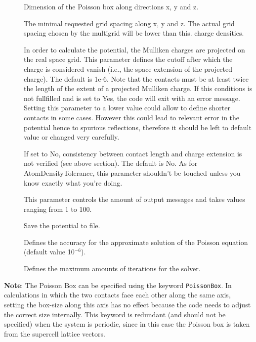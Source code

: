 \begin{description}
\item[] Dimension of the Poisson box
  along directions x, y and z.
\item[] The minimal requested grid
  spacing along x, y and z. The actual grid spacing chosen by the multigrid will
  be lower than this.  charge densities.
  \item[] In order to calculate the potential, the
    Mulliken charges are projected on the real space grid. This parameter
    defines the cutoff after which the charge is considered vanish (i.e., the
    space extension of the projected charge). The default is 1e-6. Note that the
    contacts must be at least twice the length of the extent of a projected
    Mulliken charge. If this conditions is not fullfilled and is set to Yes, the
    code will exit with an error message. Setting this parameter to a lower
    value could allow to define shorter contacts in some cases. However this
    could lead to relevant error in the potential hence to spurious reflections,
    therefore it should be left to default value or changed very carefully.
  \item[] If set to No, consistency between contact length and
    charge extension is not verified (see above section). The default is No. As
    for AtomDensityTolerance, this parameter shouldn't be touched unless you
    know exactly what you're doing.
  \item[] This parameter controls the amount of output messages
    and takes values ranging from 1 to 100.
  \item[] Save the potential to file. 
\item[] Defines the accuracy for the approximate solution of
  the Poisson equation (default value 10$^{-6}$).
\item[] Defines the maximum amounts of iterations for
  the solver.
\end{description}

{\bf Note}: The Poisson Box can be specified using the keyword
\verb|PoissonBox|. In calculations in which the two contacts face each other
along the same axis, setting the box-size along this axis has no effect because
the code needs to adjust the correct size internally.  This keyword is redundant
(and should not be specified) when the system is periodic, since in this case
the Poisson box is taken from the supercell lattice vectors.

